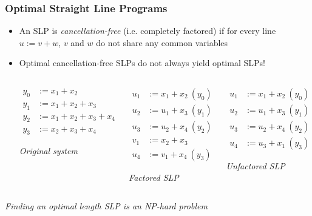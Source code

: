 \documentclass[10pt]{beamer}
\begin{document}
\begin{frame}
	\frametitle{Optimal Straight Line Programs}
	\begin{itemize}
		\item An SLP is \emph{cancellation-free} (i.e. completely factored) if for every line $u := v + w$, $v$ and $w$ do not share any common variables
		\pause 
		\item Optimal cancellation-free SLPs do not always yield optimal SLPs!
{\scriptsize

\begin{columns}[t]
\begin{column}[t]{0.305\linewidth}

\begin{align*}
y_0 & := x_1 + x_2 \\
y_1 & := x_1 + x_2 + x_3 \\
y_2 & := x_1 + x_2 + x_3 + x_4 \\
y_3 & := x_2 + x_3 + x_4 
\end{align*}

\begin{center}
\emph{Original system}
\end{center}

\end{column}

\begin{column}[t]{0.305\linewidth}

\begin{align*}
u_1 & := x_1 + x_2 \: (y_0)\\
u_2 & := u_1 + x_3 \: (y_1)\\
u_3 & := u_2 + x_4 \: (y_2)\\
v_1 & := x_2 + x_3 \\
u_4 & := v_1 + x_4 \: (y_3)
\end{align*}

\begin{center}
\emph{Factored SLP}
\end{center}

\end{column}

\begin{column}[t]{0.305\linewidth}

\begin{align*}
u_1 & := x_1 + x_2 \: (y_0)\\
u_2 & := u_1 + x_3 \: (y_1)\\
u_3 & := u_2 + x_4 \: (y_2)\\
u_4 & := u_3 + x_1 \: (y_3)
\end{align*}

\begin{center}
\emph{Unfactored SLP}
\end{center}

\end{column}

\end{columns}
}
	\end{itemize}

\pause
\begin{center}
\emph{Finding an optimal length SLP is an NP-hard problem}
\end{center}
\end{frame}
\end{document}
